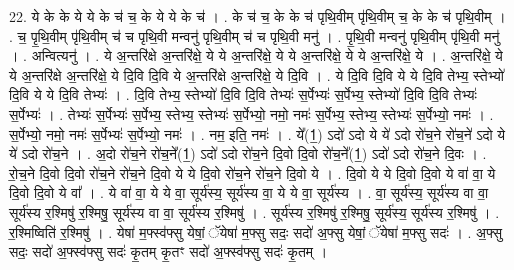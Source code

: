 \documentclass[17pt]{extarticle}
\begin{document}
22. ये के के ये ये के च॑ च॒ के ये ये के च॑ । . के च॑ च॒ के के च॑ पृथि॒वीम् पृ॑थि॒वीम् च॒ के के च॑ पृथि॒वीम् । . च॒ पृ॒थि॒वीम् पृ॑थि॒वीम् च॑ च पृथि॒वी मन्वनु॑ पृथि॒वीम् च॑ च पृथि॒वी मनु॑ । . पृ॒थि॒वी मन्वनु॑ पृथि॒वीम् पृ॑थि॒वी मनु॑ । . अन्वित्यनु॑ । . ये अ॒न्तरि॑क्षे अ॒न्तरि॑क्षे॒ ये ये अ॒न्तरि॑क्षे॒ ये ये अ॒न्तरि॑क्षे॒ ये ये अ॒न्तरि॑क्षे॒ ये । . अ॒न्तरि॑क्षे॒ ये ये अ॒न्तरि॑क्षे अ॒न्तरि॑क्षे॒ ये दि॒वि दि॒वि ये अ॒न्तरि॑क्षे अ॒न्तरि॑क्षे॒ ये दि॒वि । . ये दि॒वि दि॒वि ये ये दि॒वि तेभ्य॒ स्तेभ्यो॑ दि॒वि ये ये दि॒वि तेभ्यः॑ । . दि॒वि तेभ्य॒ स्तेभ्यो॑ दि॒वि दि॒वि तेभ्यः॑ स॒र्पेभ्यः॑ स॒र्पेभ्य॒ स्तेभ्यो॑ दि॒वि दि॒वि तेभ्यः॑ स॒र्पेभ्यः॑ । . तेभ्यः॑ स॒र्पेभ्यः॑ स॒र्पेभ्य॒ स्तेभ्य॒ स्तेभ्यः॑ स॒र्पेभ्यो॒ नमो॒ नमः॑ स॒र्पेभ्य॒ स्तेभ्य॒ स्तेभ्यः॑ स॒र्पेभ्यो॒ नमः॑ । . स॒र्पेभ्यो॒ नमो॒ नमः॑ स॒र्पेभ्यः॑ स॒र्पेभ्यो॒ नमः॑ । . नम॒ इति॒ नमः॑ । . ये᳚(1॒) ऽदो॑ ऽदो ये ये॑ ऽदो रो॑च॒ने रो॑च॒ने॑ ऽदो ये ये॑ ऽदो रो॑च॒ने । . अ॒दो रो॑च॒ने रो॑च॒ने᳚(1॒) ऽदो॑ ऽदो रो॑च॒ने दि॒वो दि॒वो रो॑च॒ने᳚(1॒) ऽदो॑ ऽदो रो॑च॒ने दि॒वः । . रो॒च॒ने दि॒वो दि॒वो रो॑च॒ने रो॑च॒ने दि॒वो ये ये दि॒वो रो॑च॒ने रो॑च॒ने दि॒वो ये । . दि॒वो ये ये दि॒वो दि॒वो ये वा॑ वा॒ ये दि॒वो दि॒वो ये वा᳚ । . ये वा॑ वा॒ ये ये वा॒ सूर्य॑स्य॒ सूर्य॑स्य वा॒ ये ये वा॒ सूर्य॑स्य । . वा॒ सूर्य॑स्य॒ सूर्य॑स्य वा वा॒ सूर्य॑स्य र॒श्मिषु॑ र॒श्मिषु॒ सूर्य॑स्य वा वा॒ सूर्य॑स्य र॒श्मिषु॑ । . सूर्य॑स्य र॒श्मिषु॑ र॒श्मिषु॒ सूर्य॑स्य॒ सूर्य॑स्य र॒श्मिषु॑ । . र॒श्मिष्विति॑ र॒श्मिषु॑ । . येषा॑ म॒फ्स्व॑फ्सु येषां॒ ॅयेषा॑ म॒फ्सु सदः॒ सदो॑ अ॒फ्सु येषां॒ ॅयेषा॑ म॒फ्सु सदः॑ । . अ॒फ्सु सदः॒ सदो॑ अ॒फ्स्व॑फ्सु सदः॑ कृ॒तम् कृ॒तꣳ सदो॑ अ॒फ्स्व॑फ्सु सदः॑ कृ॒तम् । \newline
\end{document}
